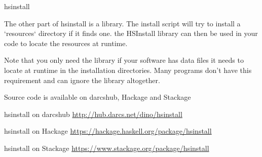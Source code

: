\begin{hcarentry}[new]{hsinstall}
\vspace{5mm}

The other part of hsinstall is a library. The install script will try
to install a `resources` directory if it finds one. the HSInstall
library can then be used in your code to locate the resources
at runtime.

\vspace{5mm}

Note that you only need the library if your software has data files
it needs to locate at runtime in the installation directories. Many
programs don't have this requirement and can ignore the library
altogether.

\vspace{5mm}

Source code is available on darcshub, Hackage and Stackage

\FurtherReading
\begin{compactitem}
 \item hsinstall on darcshub \url{http://hub.darcs.net/dino/hsinstall}
 \item hsinstall on Hackage \url{https://hackage.haskell.org/package/hsinstall}
 \item hsinstall on Stackage \url{https://www.stackage.org/package/hsinstall}
\end{compactitem}

\end{hcarentry}
